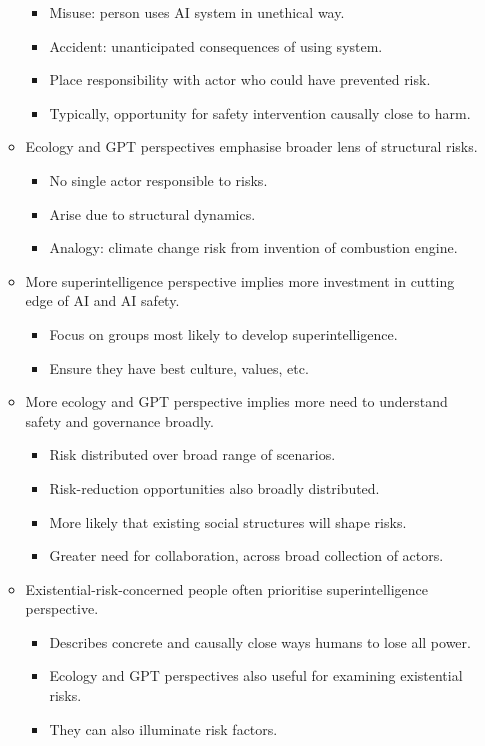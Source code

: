\begin{itemize}
\begin{itemize}
        \begin{itemize}
            \item Misuse: person uses AI system in unethical way.
            \item Accident: unanticipated consequences of using system.
            \item Place responsibility with actor who could have prevented risk.
            \item Typically, opportunity for safety intervention causally close to harm.
        \end{itemize}
        \item Ecology and GPT perspectives emphasise broader lens of structural risks.
        \begin{itemize}
            \item No single actor responsible to risks.
            \item Arise due to structural dynamics.
            \item Analogy: climate change risk from invention of combustion engine.
        \end{itemize}
        \item More superintelligence perspective implies more investment in cutting edge of AI and AI safety.
        \begin{itemize}
            \item Focus on groups most likely to develop superintelligence.
            \item Ensure they have best culture, values, etc.
        \end{itemize}
        \item More ecology and GPT perspective implies more need to understand safety and governance broadly.
        \begin{itemize}
            \item Risk distributed over broad range of scenarios.
            \item Risk-reduction opportunities also broadly distributed.
            \item More likely that existing social structures will shape risks.
            \item Greater need for collaboration, across broad collection of actors.
        \end{itemize}
        \item Existential-risk-concerned people often prioritise superintelligence perspective.
        \begin{itemize}
            \item Describes concrete and causally close ways humans to lose all power.
            \item Ecology and GPT perspectives also useful for examining existential risks.
            \item They can also illuminate risk factors.
        \end{itemize}
    \end{itemize}
\end{itemize}


